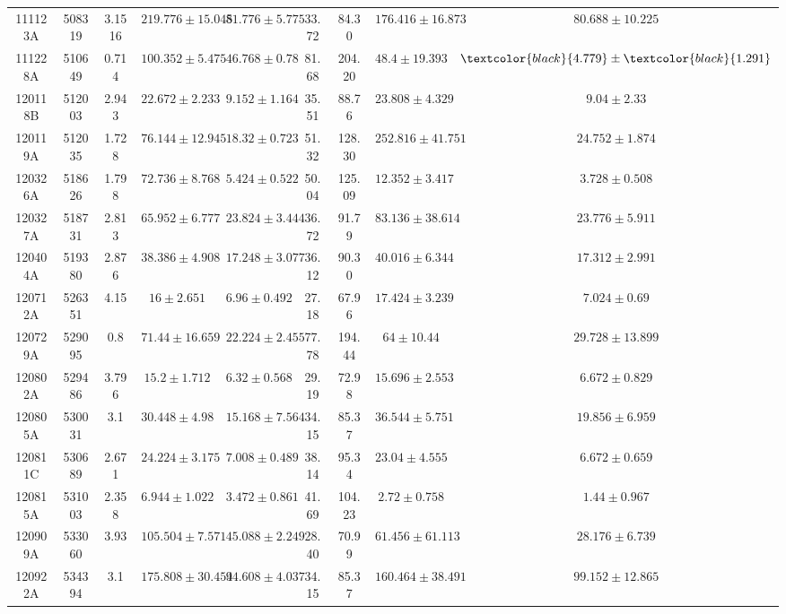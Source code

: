 \documentclass[prd,nofootinbib,preprintnumbers,floatfix]{revtex4}  %
\newcommand{\rthis}[1]{\textcolor{black}{#1}}
\begin{document}
\begin{center}
\begin{longtable*}{|c|c|c|c|c|c|c|c|c|}
111123A	&	508319	&	3.1516	&	$	219.776	\pm	15.045	$	&	$	81.776	\pm	5.775	$	&	33.72	&	84.30	&	$	176.416	\pm	16.873	$	&	$	80.688	\pm	10.225	$	\\
111228A	&	510649	&	0.714	&	$	100.352	\pm	5.475	$	&	$	46.768	\pm	0.78	$	&	81.68	&	204.20	&	$	48.4	\pm	19.393	$	&	$	\rthis{4.779}	\pm	\rthis{1.291}	$	\\
120118B	&	512003	&	2.943	&	$	22.672	\pm	2.233	$	&	$	9.152	\pm	1.164	$	&	35.51	&	88.76	&	$	23.808	\pm	4.329	$	&	$	9.04	\pm	2.33	$	\\
120119A	&	512035	&	1.728	&	$	76.144	\pm	12.945	$	&	$	18.32	\pm	0.723	$	&	51.32	&	128.30	&	$	252.816	\pm	41.751	$	&	$	24.752	\pm	1.874	$	\\
120326A	&	518626	&	1.798	&	$	72.736	\pm	8.768	$	&	$	5.424	\pm	0.522	$	&	50.04	&	125.09	&	$	12.352	\pm	3.417	$	&	$	3.728	\pm	0.508	$	\\
120327A	&	518731	&	2.813	&	$	65.952	\pm	6.777	$	&	$	23.824	\pm	3.444	$	&	36.72	&	91.79	&	$	83.136	\pm	38.614	$	&	$	23.776	\pm	5.911	$	\\
120404A	&	519380	&	2.876	&	$	38.386	\pm	4.908	$	&	$	17.248	\pm	3.077	$	&	36.12	&	90.30	&	$	40.016	\pm	6.344	$	&	$	17.312	\pm	2.991	$	\\
120712A	&	526351	&	4.15	&	$	16	\pm	2.651	$	&	$	6.96	\pm	0.492	$	&	27.18	&	67.96	&	$	17.424	\pm	3.239	$	&	$	7.024	\pm	0.69	$	\\
120729A	&	529095	&	0.8	&	$	71.44	\pm	16.659	$	&	$	22.224	\pm	2.455	$	&	77.78	&	194.44	&	$	64	\pm	10.44	$	&	$	29.728	\pm	13.899	$	\\
120802A	&	529486	&	3.796	&	$	15.2	\pm	1.712	$	&	$	6.32	\pm	0.568	$	&	29.19	&	72.98	&	$	15.696	\pm	2.553	$	&	$	6.672	\pm	0.829	$	\\
120805A	&	530031	&	3.1	&	$	30.448	\pm	4.98	$	&	$	15.168	\pm	7.564	$	&	34.15	&	85.37	&	$	36.544	\pm	5.751	$	&	$	19.856	\pm	6.959	$	\\
120811C	&	530689	&	2.671	&	$	24.224	\pm	3.175	$	&	$	7.008	\pm	0.489	$	&	38.14	&	95.34	&	$	23.04	\pm	4.555	$	&	$	6.672	\pm	0.659	$	\\
120815A	&	531003	&	2.358	&	$	6.944	\pm	1.022	$	&	$	3.472	\pm	0.861	$	&	41.69	&	104.23	&	$	2.72	\pm	0.758	$	&	$	1.44	\pm	0.967	$	\\
120909A	&	533060	&	3.93	&	$	105.504	\pm	7.571	$	&	$	45.088	\pm	2.249	$	&	28.40	&	70.99	&	$	61.456	\pm	61.113	$	&	$	28.176	\pm	6.739	$	\\
120922A	&	534394	&	3.1	&	$	175.808	\pm	30.454	$	&	$	94.608	\pm	4.037	$	&	34.15	&	85.37	&	$	160.464	\pm	38.491	$	&	$	99.152	\pm	12.865	$	\\

\end{longtable*}
\end{center}
\end{document}
